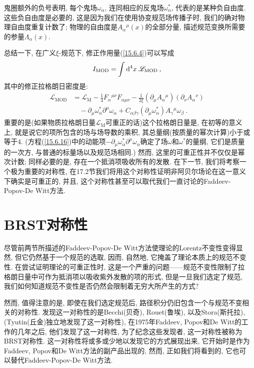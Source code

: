 鬼圈额外的负号表明, 每个鬼场$\omega _{\alpha }$, 连同相应的反鬼场$\omega _{\alpha }^{\ast }$, %
代表的是某种负自由度. 这些负自由度是必要的, 这是因为我们在使用协变规范场传播子时, 我们的确对物理自由度重复计数了; 物理的自由度是$A_{\alpha}{}^{\mu }(x)$的全部分量, {}描述规范变换所需要的参量$\Lambda _{\alpha }(x)$.

总结一下, 在广义$\xi $-规范下, 修正作用量(\ref{15.6.4})可以写成
\begin{equation}
I_{\mathrm{MOD}}=\int \mathrm{d}^{4}x\:\mathscr{L}_{\mathrm{MOD}}\:,   \label{15.6.15}
\end{equation}%
其中的修正拉格朗日密度是:%
\begin{align}
\mathscr{L}_{\mathrm{MOD}} &=\mathscr{L}_{\text{M}}-\frac{1}{4}F_{\alpha
}{}^{\mu \nu }F_{\alpha \mu \nu }-\frac{1}{2\xi }(\partial _{\mu }A_{\alpha
}{}^{\mu })(\partial _{\nu }A_{\alpha}{}^{\nu }) \nonumber\\
&\quad-\partial _{\mu }\omega _{\alpha }^{\ast }\partial ^{\mu }\omega _{\alpha
}+C_{\alpha \beta \gamma }(\partial _{\mu }\omega _{\alpha }^{\ast
})A_{\gamma}{}^{\mu }\omega _{\beta }\:.   \label{15.6.16}
\end{align}%
重要的是(如果物质拉格朗日量$\mathscr{L}_{\mathrm{M}}$可重正的话)这个拉格朗日量是{}, 
在初等的意义上, 就是说它的项所包含的场与场导数的乘积, 其总量纲(按质量的幂次计算)小于或等于4. 
(方程(\ref{15.6.16})中的动能项$-\partial _{\mu }\omega _{\alpha
}^{\ast }\partial ^{\mu }\omega _{\alpha }$确定了场$%
\omega $和$\omega ^{\ast }$的量纲, 它们是质量的一次方, 与普通的标量场以及规范场相同.) 然而, 这里的可重正性并不仅仅是幂次计数; 同样必要的是, 存在一个抵消项吸收所有的发散. 在下一节, 我们将考察一个极为重要的对称性, 在17.2节我们将用这个对称性证明非阿贝尔场论在这一意义下确实是可重正的, 并且, 这个对称性甚至可以取代我们一直讨论的Faddeev-Popov-De Witt方法.

\section{BRST对称性}

尽管前两节所描述的Faddeev-Popov-De Witt方法使理论的Lorentz不变性变得显然, 但它仍然基于一个规范的选取, 因而, 自然地, 它掩盖了理论本质上的规范不变性. 在尝试证明理论的可重正性时, 这是一个严重的问题------规范不变性限制了拉格朗日量中可作为抵消项以吸收紫外发散的项的形式, 但是一旦我们选定了规范, 我们如何知道规范不变性是否仍然会限制着无穷大所产生的方式?

然而, 值得注意的是, 即使在我们选定规范后, 路径积分仍旧包含一个与规范不变相关的对称性. 发现这一对称性的是Becchi(贝奇), Rouet(鲁埃), 以及Stora(斯托拉)\cite{10}, (Tyutin(丘金)\cite{11}独立地发现了这一对称性), 在1975年Faddeev, Popov和De Witt的工作的几年之后, 他们发现了这一对称性, 为了纪念这些发现者, 这一对称性被称为BRST对称性. 这一对称性将或多或少地以发现它的方式展现出来, 它开始时是作为Faddeev, Popov和De Witt方法的副产品出现的, 然而, 正如我们将看到的, 它也可以替代Faddeev-Popov-De Witt方法.


